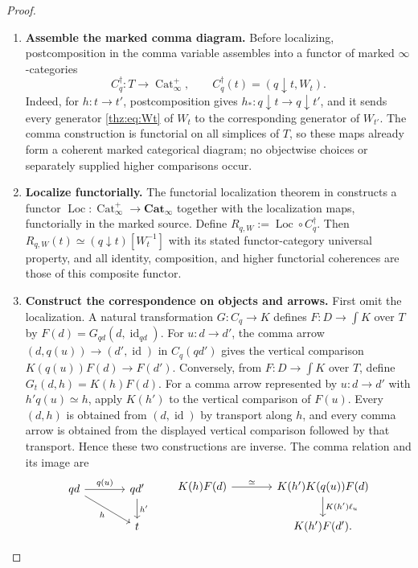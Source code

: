 \documentclass[oneside]{article}
\theoremstyle{plain}
\theoremstyle{definition}
\theoremstyle{remark}
\newcommand{\Cat}{\mathbf{Cat}_{\infty}}
\newcommand{\id}{\operatorname{id}}
\begin{document}
\begin{proof}
\leavevmode
\begin{enumerate}
\item \textbf{Assemble the marked comma diagram.} Before localizing, postcomposition in the comma variable assembles into a
functor of marked $\infty$-categories
\[
 C_q^\dagger:T\longrightarrow\operatorname{Cat}_\infty^+,
 \qquad
 C_q^\dagger(t)=(q\downarrow t,W_t).
\]
Indeed, for $h:t\to t'$, postcomposition gives
$h_*:q\downarrow t\to q\downarrow t'$, and it sends every generator
\eqref{thz:eq:Wt} of $W_t$ to the corresponding generator of $W_{t'}$.
The comma construction is functorial on all simplices of $T$, so these maps
already form a coherent marked categorical diagram; no objectwise choices or
separately supplied higher comparisons occur.
\item \textbf{Localize functorially.} The functorial localization theorem in
\cite[\S6.3]{Kerodon} constructs a functor $\operatorname{Loc}:\operatorname{Cat}_\infty^+ \longrightarrow\Cat$ together with the localization maps, functorially in the marked source.
Define $R_{q,W}:=\operatorname{Loc}\circ C_q^\dagger.$ Then
$R_{q,W}(t)\simeq(q\downarrow t)[W_t^{-1}]$ with its stated
functor-category universal property, and all identity, composition, and
higher functorial coherences are those of this composite functor.
\item \textbf{Construct the correspondence on objects and arrows.} First omit the localization.  A natural transformation $G:C_q\to K$
defines $F:D\to\int K$ over $T$ by $F(d)=G_{qd}(d,\id_{qd}).$ For $u:d\to d'$, the comma arrow
$(d,q(u))\to(d',\id)$ in $C_q(qd')$ gives the vertical comparison $K(q(u))F(d)\longrightarrow F(d').$ Conversely, from $F:D\to\int K$ over $T$, define $G_t(d,h)=K(h)F(d).$ For a comma arrow represented by $u:d\to d'$ with
$h'q(u)\simeq h$, apply $K(h')$ to the vertical comparison of $F(u)$.
Every $(d,h)$ is obtained from $(d,\id)$ by transport along $h$, and
every comma arrow is obtained from the displayed vertical comparison
followed by that transport.  Hence these two constructions are inverse.
The comma relation and its image are
\[
\begin{tikzcd}[column sep=large]
 qd\ar[r,"q(u)"]\ar[dr,"h"']&qd'\ar[d,"h'"]\\
 &t
\end{tikzcd}
\qquad
\begin{tikzcd}[column sep=large]
 K(h)F(d)\ar[r,"\simeq"]&
 K(h')K(q(u))F(d)\ar[d,"K(h')\ell_u"]\\
 &K(h')F(d').

\end{tikzcd}\]
\end{enumerate}
\end{proof}
\end{document}
